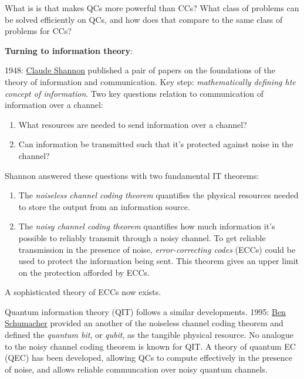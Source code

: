 \documentclass{article}
\begin{document}
What is is that makes QCs more powerful than CCs? What class of problems can be solved efficiently on QCs, and how does that compare to the same class of problems for CCs?

\textbf{Turning to information theory}:

1948: \href{https://en.wikipedia.org/wiki/Claude_Shannon}{Claude Shannon} published a pair of papers on the foundations of the theory of information and communication. Key step: \textit{mathematically defining hte concept of information}. Two key questions relation to communication of information over a channel:

\begin{enumerate}
\item What resources are needed to send information over a channel?
\item Can information be transmitted such that it's protected against noise in the channel?
\end{enumerate}

Shannon answered these questions with two fundamental IT theorems:

\begin{enumerate}
\item The \textit{noiseless channel coding theorem} quantifies the physical resources needed to store the output from an information source.
\item The \textit{noisy channel coding theorem} quantifies how much information it's possible to reliably transmit through a noisy channel. To get reliable transmission in the presence of noise, \textit{error-correcting codes} (ECCs) could be used to protect the information being sent. This theorem gives an upper limit on the protection afforded by ECCs.
\end{enumerate}

A sophisticated theory of ECCs now exists.

Quantum information theory (QIT) follows a similar developments. 1995: \href{https://en.wikipedia.org/wiki/Benjamin_Schumacher}{Ben Schumacher} provided an another of the noiseless channel coding theorem and defined the \textit{quantum bit}, or \textit{qubit}, as the tangible physical resource. No analogue to the noisy channel coding theorem is known for QIT. A theory of quantum EC (QEC) has been developed, allowing QCs to compute effectively in the presence of noise, and allows reliable communcation over noisy quantum channels.
\end{document}

